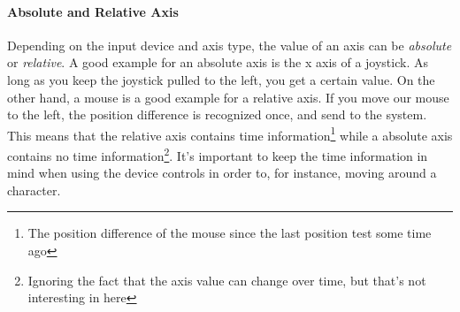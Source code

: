 \paragraph{Absolute and Relative Axis}
Depending on the input device and axis type, the value of an axis can be \emph{absolute} or \emph{relative}. A good example for an absolute axis is the x axis of a joystick. As long as you keep the joystick pulled to the left, you get a certain value. On the other hand, a mouse is a good example for a relative axis. If you move our mouse to the left, the position difference is recognized once, and send to the system. This means that the relative axis contains time information\footnote{The position difference of the mouse since the last position test some time ago} while a absolute axis contains no time information\footnote{Ignoring the fact that the axis value can change over time, but that's not interesting in here}. It's important to keep the time information in mind when using the device controls in order to, for instance, moving around a character.





\cleardoublepage

\cleardoublepage
